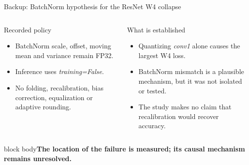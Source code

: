 \documentclass[aspectratio=169,10pt]{beamer}
\newcommand{\takeaway}[1]{\vfill\begin{beamercolorbox}[wd=\textwidth,sep=1.5mm,rounded=true]{block body}\centering\small\bfseries #1\end{beamercolorbox}}
\begin{document}
\appendix
\begin{frame}{Backup: BatchNorm hypothesis for the ResNet W4 collapse}
\begin{center}
\end{center}
\vspace{3mm}
\begin{columns}[T,onlytextwidth]
\begin{block}{Recorded policy}
\small
\begin{itemize}
  \item BatchNorm scale, offset, moving mean and variance remain FP32.
  \item Inference uses \emph{training=False}.
  \item No folding, recalibration, bias correction, equalization or adaptive rounding.
\end{itemize}
\end{block}
\begin{alertblock}{What is established}
\small
\begin{itemize}
  \item Quantizing \emph{conv1} alone causes the largest W4 loss.
  \item BatchNorm mismatch is a plausible mechanism, but it was not isolated or tested.
  \item The study makes no claim that recalibration would recover accuracy.
\end{itemize}
\end{alertblock}
\end{columns}
\takeaway{The location of the failure is measured; its causal mechanism remains unresolved.}
\end{frame}
\end{document}
